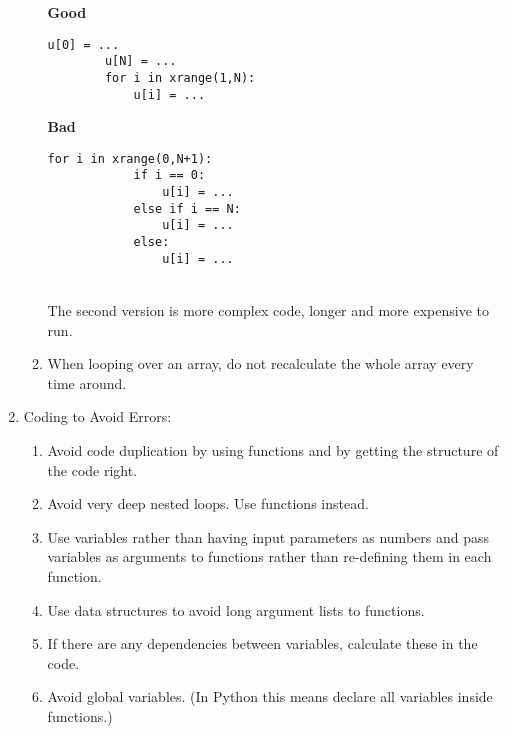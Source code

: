 \begin{enumerate}
\begin{enumerate}
     {\bf Good \hspace{-0.05\linewidth}}
    \begin{minipage}[t]{0.45\linewidth}\vspace{-10pt}
        \begin{lstlisting}[frame=none]
        u[0] = ...
        u[N] = ...
        for i in xrange(1,N):
            u[i] = ...
        \end{lstlisting}
    \end{minipage}
    {\bf Bad \hspace{-0.05\linewidth}}
    \begin{minipage}[t]{0.3\linewidth}\vspace{-10pt}
        \begin{lstlisting}[frame=none]
        for i in xrange(0,N+1):
            if i == 0:
                u[i] = ...
            else if i == N:
                u[i] = ...
            else:
                u[i] = ...
        \end{lstlisting}
    \end{minipage} \vspace{-12pt} \\
The second version is more complex code, longer and more expensive to run.
    \item When looping over an array, do not recalculate the whole array every time around.
    \end{enumerate}

\item Coding to Avoid Errors:
    \begin{enumerate}
    \item Avoid code duplication by using functions and by getting the structure of the code right.

    \item Avoid very deep nested loops. Use functions instead.

    \item Use variables rather than having input parameters as numbers and pass variables as arguments to functions rather than re-defining them in each function.

    \item Use data structures to avoid long argument lists to functions.

    \item If there are any dependencies between variables, calculate these in the code.
    
    \item Avoid global variables. (In Python this means declare all variables inside functions.)
    \end{enumerate}


\end{enumerate}

